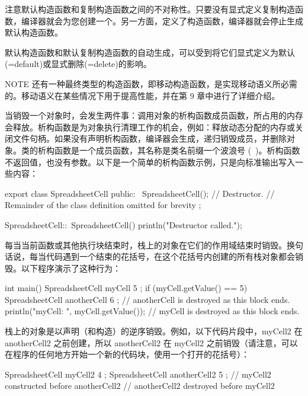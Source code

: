 注意默认构造函数和复制构造函数之间的不对称性。只要没有显式定义复制构造函数，编译器就会为您创建一个。另一方面，定义了构造函数，编译器就会停止生成默认构造函数。

默认构造函数和默认复制构造函数的自动生成，可以受到将它们显式定义为默认(=default)或显式删除(=delete)的影响。

\begin{myNotic}{NOTE}
还有一种最终类型的构造函数，即移动构造函数，是实现移动语义所必需的。移动语义在某些情况下用于提高性能，并在第 9 章中进行了详细介绍。
\end{myNotic}


当销毁一个对象时，会发生两件事：调用对象的析构函数成员函数，所占用的内存会释放。析构函数是为对象执行清理工作的机会，例如：释放动态分配的内存或关闭文件句柄。如果没有声明析构函数，编译器会生成，递归销毁成员，并删除对象。类的析构函数是一个成员函数，其名称是类名前缀一个波浪号 (~)。析构函数不返回值，也没有参数。以下是一个简单的析构函数示例，只是向标准输出写入一些内容：

\begin{cpp}
export class SpreadsheetCell
{
    public:
        ~SpreadsheetCell(); // Destructor.
        // Remainder of the class definition omitted for brevity
};

SpreadsheetCell::~SpreadsheetCell()
{
    println("Destructor called.");
}
\end{cpp}

每当当前函数或其他执行块结束时，栈上的对象在它们的作用域结束时销毁。换句话说，每当代码遇到一个结束的花括号，在这个花括号内创建的所有栈对象都会销毁。以下程序演示了这种行为：

\begin{cpp}
int main()
{
    SpreadsheetCell myCell { 5 };
    if (myCell.getValue() == 5) {
        SpreadsheetCell anotherCell { 6 };
    } // anotherCell is destroyed as this block ends.
    println("myCell: {}", myCell.getValue());
} // myCell is destroyed as this block ends.
\end{cpp}

栈上的对象是以声明（和构造）的逆序销毁。例如，以下代码片段中，myCell2 在 anotherCell2 之前创建，所以 anotherCell2 在 myCell2 之前销毁（请注意，可以在程序的任何地方开始一个新的代码块，使用一个打开的花括号）：

\begin{cpp}
{
    SpreadsheetCell myCell2 { 4 };
    SpreadsheetCell anotherCell2 { 5 }; // myCell2 constructed before anotherCell2
} // anotherCell2 destroyed before myCell2
\end{cpp}

